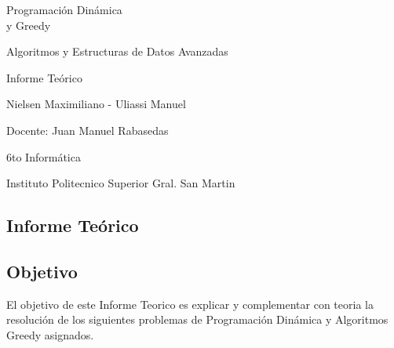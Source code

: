 \documentclass[10pt]{article}
\begin{document}
\pagestyle{fancy}
\renewcommand{\headrulewidth}{0.4pt}
\renewcommand{\footrulewidth}{0.4pt}

\begin{titlepage}
\null
\vspace{4cm}
\centering
{\Huge Programaci\'on Din\'amica\\ y Greedy}

\vspace{0.2cm}

{\LARGE Algoritmos y Estructuras de Datos Avanzadas}

\vspace{0.2cm}

{\large Informe Te\'orico}

\vspace{1.5cm}

{\LARGE Nielsen Maximiliano - Uliassi Manuel}

\vspace{0.15cm}

{\large Docente: Juan Manuel Rabasedas}

\vspace{0.15cm}

{\large 6to Inform\'atica}

\vspace{0.15cm}

{\large Instituto Politecnico Superior Gral. San Martin}
\vfill

\end{titlepage}
\begin{center}
\section*{\LARGE Informe Te\'orico}
\end{center}
\subsection*{Objetivo}
El objetivo de este Informe Teorico es explicar y complementar con teoria la resoluci\'on de los siguientes problemas de Programaci\'on Din\'amica y Algoritmos Greedy asignados.
\end{document}
